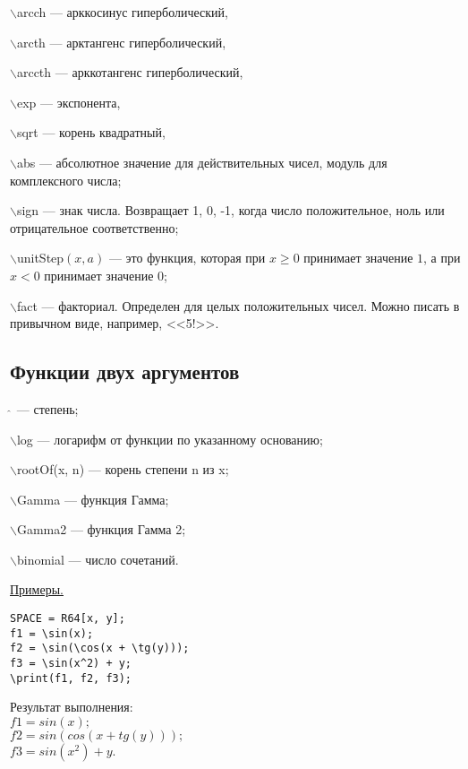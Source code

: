  $\backslash$arcch --- арккосинус гиперболический, 

 $\backslash$arcth --- арктангенс гиперболический, 

 $\backslash$arccth --- арккотангенс гиперболический, 

 $\backslash$exp --- экспонента, 

 $\backslash$sqrt --- корень квадратный, 

 $\backslash$abs --- абсолютное значение для действительных чисел,  модуль для комплексного числа;

 $\backslash$sign --- знак числа. Возвращает 1, 0,  -1,  когда число положительное, ноль или отрицательное  соответственно;

$\backslash$unitStep$(x,a)$ --- это функция, которая при $x \geqslant 0$ принимает значение $1$, а
при $x<0$ принимает значение $0$;

 $\backslash$fact   --- факториал.  Определен для целых положительных чисел.  Можно писать в привычном виде,  например, <<5!>>. 

\subsection{Функции двух аргументов}



\hspace*{4mm} $\widehat{\ }{}$  --- степень;

 $\backslash$log --- логарифм от функции по указанному основанию;

 $\backslash$rootOf(x, n) --- корень степени n из x; 

 $\backslash$Gamma --- функция Гамма;

 $\backslash$Gamma2 --- функция Гамма 2;

 $\backslash$binomial --- число сочетаний. 

\smallskip

\underline{Примеры. }

\begin{verbatim}
SPACE = R64[x, y];
f1 = \sin(x);
f2 = \sin(\cos(x + \tg(y)));
f3 = \sin(x^2) + y;
\print(f1, f2, f3);
\end{verbatim}\vspace*{-3mm}

Результат выполнения:\\
\hspace*{4mm} $f1 = sin(x); $\\
\hspace*{4mm} $f2 = sin(cos(x+tg(y))); $\\
\hspace*{4mm} $f3 = sin(x^{2})+y. $

